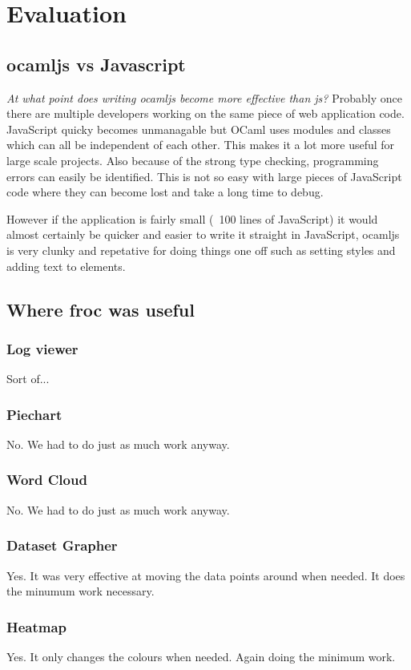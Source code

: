 \chapter{Evaluation}

\section{ocamljs vs Javascript}
\emph{At what point does writing ocamljs become more effective than js?} Probably once there are multiple developers working on the same piece of web application code. JavaScript quicky becomes unmanagable but OCaml uses modules and classes which can all be independent of each other. This makes it a lot more useful for large scale projects. Also because of the strong type checking, programming errors can easily be identified. This is not so easy with large pieces of JavaScript code where they can become lost and take a long time to debug.

However if the application is fairly small (~100 lines of JavaScript) it would almost certainly be quicker and easier to write it straight in JavaScript, ocamljs is very clunky and repetative for doing things one off such as setting styles and adding text to elements.

\section{Where froc was useful}
\subsection{Log viewer}
Sort of...
\subsection{Piechart}
No. We had to do just as much work anyway.
\subsection{Word Cloud}
No. We had to do just as much work anyway.
\subsection{Dataset Grapher}
Yes. It was very effective at moving the data points around when needed. It does the minumum work necessary.
\subsection{Heatmap}
Yes. It only changes the colours when needed. Again doing the minimum work.
